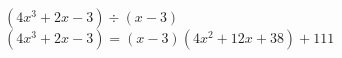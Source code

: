 {$\left(4x^3 +2x-3 \right) \div \left(x -3\right)$}
{$\left(4x^3 +2x-3 \right) = \left(x -3\right) \left(4x^2+12x+38\right) + 111$}